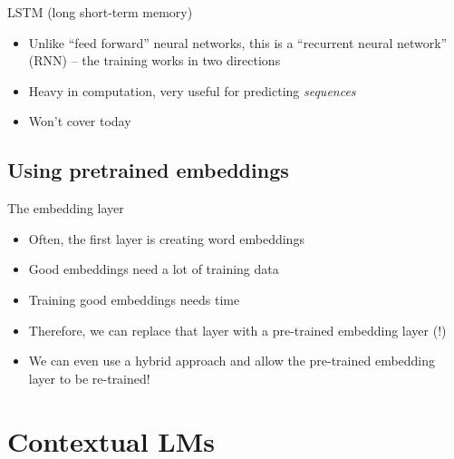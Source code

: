 \documentclass[compress]{beamer}
\begin{document}
\begin{frame}{LSTM (long short-term memory)}
	\begin{itemize}
		\item Unlike ``feed forward'' neural networks, this is  a ``recurrent neural network'' (RNN) -- the training works in two directions
		\item Heavy in computation, very useful for predicting \emph{sequences}
		\item Won't cover today
	\end{itemize}
\end{frame}


\subsection{Using pretrained embeddings}

\begin{frame}{The embedding layer}
	\begin{itemize}
		\item Often, the first layer is creating word embeddings
		\item Good embeddings need a lot of training data
		\item Training good embeddings needs time
		\item Therefore, we can replace that layer with a pre-trained embedding layer (!)
		\item We can even use a hybrid approach and allow the pre-trained embedding layer to be re-trained!
	\end{itemize}
\end{frame}

\section{Contextual LMs}
\end{document}

